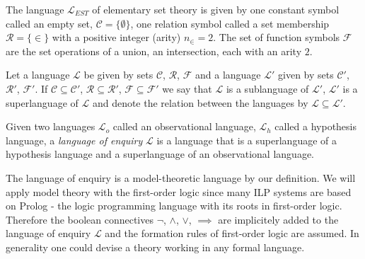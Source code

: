 \begin{exmp}
The language $\mathcal{L}_{EST}$ of elementary set theory is given by one constant symbol called an empty set, $\mathcal{C}=\{\emptyset\}$, one relation symbol called a set membership $\mathcal{R}=\{\in\}$ with a positive integer (arity) $n_{\in}=2$. The set of function symbols $\mathcal{F}$ are the set operations of a union, an intersection, each with an arity $2$.
\end{exmp}

\begin{defn}
Let a language $\mathcal{L}$ be given by sets $\mathcal{C}$, $\mathcal{R}$, $\mathcal{F}$ and a language $\mathcal{L}'$ given by sets $\mathcal{C}'$, $\mathcal{R}'$, $\mathcal{F}'$.
If $\mathcal{C} \subseteq \mathcal{C}'$, $\mathcal{R} \subseteq \mathcal{R}'$, $\mathcal{F} \subseteq \mathcal{F}'$ we say that $\mathcal{L}$ is a sublanguage of $\mathcal{L}'$, $\mathcal{L}'$ is a superlanguage of $\mathcal{L}$ and denote the relation between the languages by $\mathcal{L} \subseteq \mathcal{L}'$.
\end{defn}

\begin{defn}
Given two languages $\mathcal{L}_o$ called an observational language, $\mathcal{L}_h$ called a hypothesis language, a \emph{language of enquiry} $\mathcal{L}$ is a language that is a superlanguage of a hypothesis language and a superlanguage of an observational language.
\end{defn}

\begin{remark}
The language of enquiry is a model-theoretic language by our definition. We will apply model theory with the first-order logic since many ILP systems are based on Prolog - the logic programming language with its roots in first-order logic. Therefore the boolean connectives $\neg$, $\land$, $\lor$, $\implies$ are implicitely added to the language of enquiry $\mathcal{L}$ and the formation rules of first-order logic are assumed. In generality one could devise a theory working in any formal language.
\end{remark}

